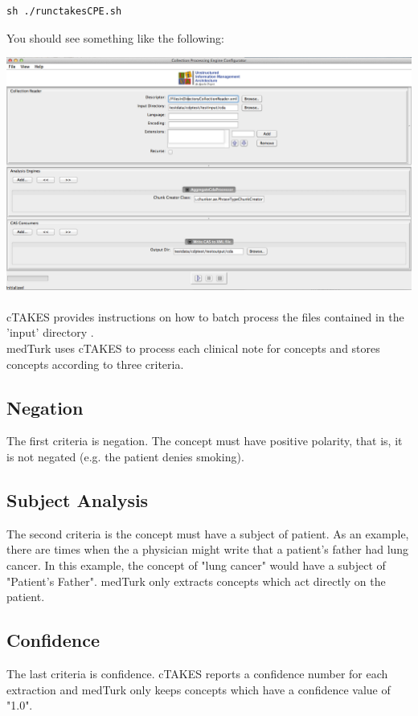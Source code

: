 \documentclass{book}
\begin{document}
\begin{verbatim}
sh ./runctakesCPE.sh
\end{verbatim}

You should see something like the following:

\includegraphics[scale=0.3]{ctakes.png}~  \\[1cm]

cTAKES provides instructions on how to batch process the files contained in the 'input' directory .
\\
medTurk uses cTAKES to process each clinical note for concepts and stores concepts according to three criteria.

\subsection*{Negation}
The first criteria is negation. The concept must have positive polarity, that is, it is not negated (e.g. the patient denies smoking).

\subsection*{Subject Analysis}
The second criteria is the concept must have a subject of patient. As an example, there are times when the a physician might write that a patient's father had lung cancer. In this example, the concept of "lung cancer" would have a subject of "Patient's Father". medTurk only extracts concepts which act directly on the patient.

\subsection*{Confidence}
The last criteria is confidence. cTAKES reports a confidence number for each extraction and medTurk only keeps concepts which have a confidence value of "1.0".
\end{document}
